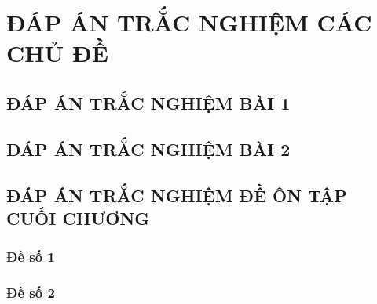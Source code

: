 \section*{ĐÁP ÁN TRẮC NGHIỆM CÁC CHỦ ĐỀ}
\subsection{ĐÁP ÁN TRẮC NGHIỆM BÀI 1}
\subsection{ĐÁP ÁN TRẮC NGHIỆM BÀI 2}

\subsection{ĐÁP ÁN TRẮC NGHIỆM ĐỀ ÔN TẬP CUỐI CHƯƠNG}

\subsubsection{Đề số 1}

\subsubsection{Đề số 2}




